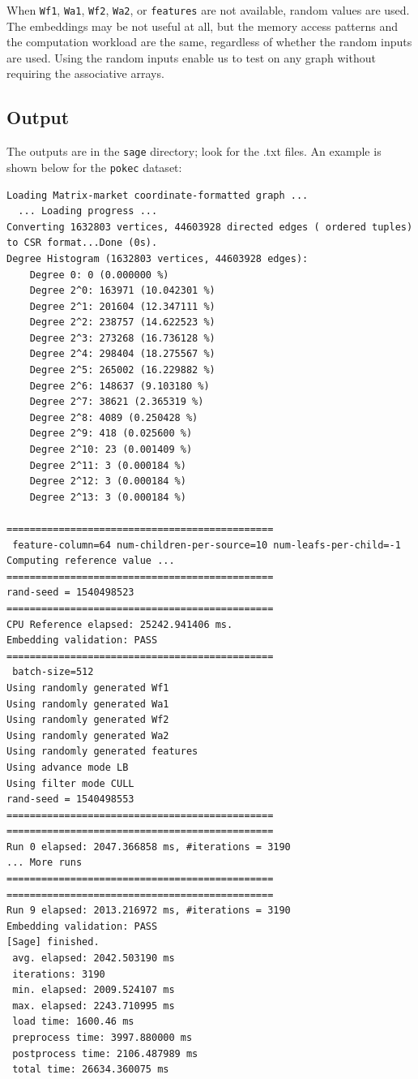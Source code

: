 \documentclass[10pt,oneside]{memoir}
\begin{document}
When \texttt{Wf1}, \texttt{Wa1}, \texttt{Wf2}, \texttt{Wa2}, or
\texttt{features} are not available, random values are used. The
embeddings may be not useful at all, but the memory access patterns and
the computation workload are the same, regardless of whether the random
inputs are used. Using the random inputs enable us to test on any graph
without requiring the associative arrays.

\hypertarget{output-1}{%
\subsection{Output}\label{output-1}}

The outputs are in the \texttt{sage} directory; look for the .txt files.
An example is shown below for the \texttt{pokec} dataset:

\begin{verbatim}
Loading Matrix-market coordinate-formatted graph ...
  ... Loading progress ...
Converting 1632803 vertices, 44603928 directed edges ( ordered tuples) to CSR format...Done (0s).
Degree Histogram (1632803 vertices, 44603928 edges):
    Degree 0: 0 (0.000000 %)
    Degree 2^0: 163971 (10.042301 %)
    Degree 2^1: 201604 (12.347111 %)
    Degree 2^2: 238757 (14.622523 %)
    Degree 2^3: 273268 (16.736128 %)
    Degree 2^4: 298404 (18.275567 %)
    Degree 2^5: 265002 (16.229882 %)
    Degree 2^6: 148637 (9.103180 %)
    Degree 2^7: 38621 (2.365319 %)
    Degree 2^8: 4089 (0.250428 %)
    Degree 2^9: 418 (0.025600 %)
    Degree 2^10: 23 (0.001409 %)
    Degree 2^11: 3 (0.000184 %)
    Degree 2^12: 3 (0.000184 %)
    Degree 2^13: 3 (0.000184 %)

==============================================
 feature-column=64 num-children-per-source=10 num-leafs-per-child=-1
Computing reference value ...
==============================================
rand-seed = 1540498523
==============================================
CPU Reference elapsed: 25242.941406 ms.
Embedding validation: PASS
==============================================
 batch-size=512
Using randomly generated Wf1
Using randomly generated Wa1
Using randomly generated Wf2
Using randomly generated Wa2
Using randomly generated features
Using advance mode LB
Using filter mode CULL
rand-seed = 1540498553
==============================================
==============================================
Run 0 elapsed: 2047.366858 ms, #iterations = 3190
... More runs
==============================================
==============================================
Run 9 elapsed: 2013.216972 ms, #iterations = 3190
Embedding validation: PASS
[Sage] finished.
 avg. elapsed: 2042.503190 ms
 iterations: 3190
 min. elapsed: 2009.524107 ms
 max. elapsed: 2243.710995 ms
 load time: 1600.46 ms
 preprocess time: 3997.880000 ms
 postprocess time: 2106.487989 ms
 total time: 26634.360075 ms
\end{verbatim}
\end{document}
